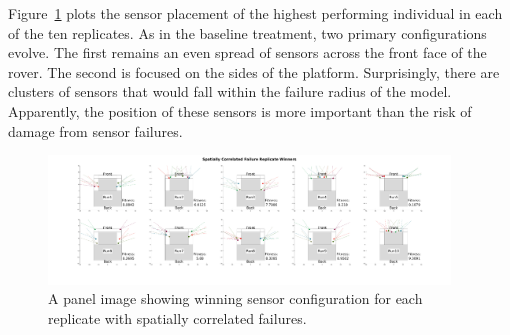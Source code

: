 Figure~\ref{spatial_failure_panel_fig} plots the sensor placement of the highest performing individual in each of the ten replicates.
%
As in the baseline treatment, two primary configurations evolve.
%
The first remains an even spread of sensors across the front face of the rover.  
%
The second is focused on the sides of the platform.  
%
Surprisingly, there are clusters of sensors that would fall within the failure radius of the model.  
%
Apparently, the position of these sensors is more important than the risk of damage from sensor failures.    



\begin{figure}[!htb]
	\centering
    \includegraphics[width=0.95\textwidth]{Figures/6_sonar_symmetric_placement_with_aoe_failure_winners_panel_2x5.png}
    \vspace{-0.3in}
    \caption{A panel image showing winning sensor configuration for each replicate with spatially correlated failures.}
    \label{spatial_failure_panel_fig}
\end{figure}




